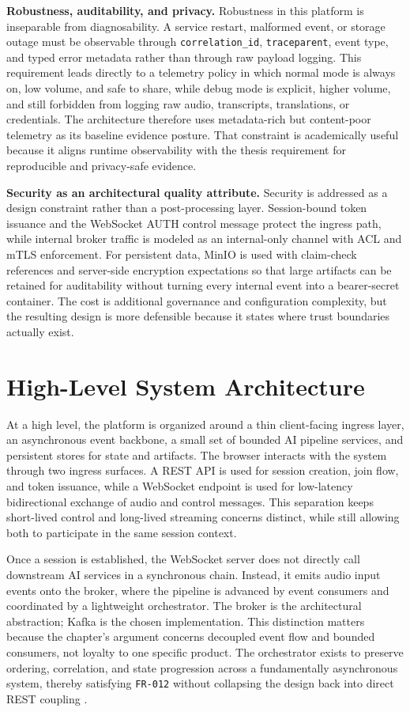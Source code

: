\textbf{Robustness, auditability, and privacy.} Robustness in this platform is inseparable from diagnosability. A service restart, malformed event, or storage outage must be observable through \texttt{correlation\_id}, \texttt{traceparent}, event type, and typed error metadata rather than through raw payload logging. This requirement leads directly to a telemetry policy in which normal mode is always on, low volume, and safe to share, while debug mode is explicit, higher volume, and still forbidden from logging raw audio, transcripts, translations, or credentials. The architecture therefore uses metadata-rich but content-poor telemetry as its baseline evidence posture. That constraint is academically useful because it aligns runtime observability with the thesis requirement for reproducible and privacy-safe evidence.

\textbf{Security as an architectural quality attribute.} Security is addressed as a design constraint rather than a post-processing layer. Session-bound token issuance and the WebSocket AUTH control message protect the ingress path, while internal broker traffic is modeled as an internal-only channel with ACL and mTLS enforcement. For persistent data, MinIO is used with claim-check references and server-side encryption expectations so that large artifacts can be retained for auditability without turning every internal event into a bearer-secret container. The cost is additional governance and configuration complexity, but the resulting design is more defensible because it states where trust boundaries actually exist.

\section{High-Level System Architecture}
\label{sec:high_level_arch}

At a high level, the platform is organized around a thin client-facing ingress layer, an asynchronous event backbone, a small set of bounded AI pipeline services, and persistent stores for state and artifacts. The browser interacts with the system through two ingress surfaces. A REST API is used for session creation, join flow, and token issuance, while a WebSocket endpoint is used for low-latency bidirectional exchange of audio and control messages. This separation keeps short-lived control and long-lived streaming concerns distinct, while still allowing both to participate in the same session context.

Once a session is established, the WebSocket server does not directly call downstream AI services in a synchronous chain. Instead, it emits audio input events onto the broker, where the pipeline is advanced by event consumers and coordinated by a lightweight orchestrator. The broker is the architectural abstraction; Kafka is the chosen implementation. This distinction matters because the chapter's argument concerns decoupled event flow and bounded consumers, not loyalty to one specific product. The orchestrator exists to preserve ordering, correlation, and state progression across a fundamentally asynchronous system, thereby satisfying \texttt{FR-012} without collapsing the design back into direct REST coupling \cite{kleppmann2017designing,hohpe2004enterprise}.

